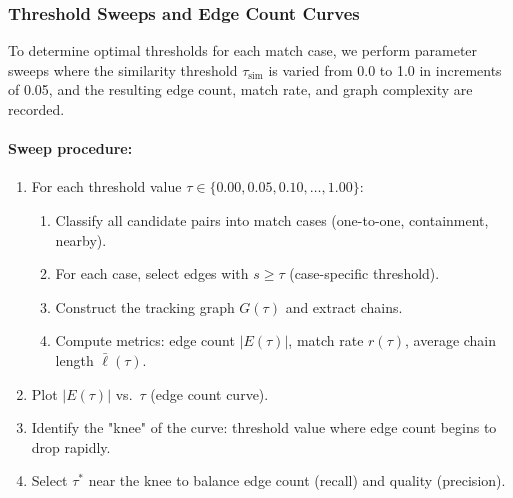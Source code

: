 \subsubsection{Threshold Sweeps and Edge Count Curves}

To determine optimal thresholds for each match case, we perform parameter sweeps where the similarity threshold $\tau_{\text{sim}}$ is varied from 0.0 to 1.0 in increments of 0.05, and the resulting edge count, match rate, and graph complexity are recorded.

\paragraph{Sweep procedure:}
\begin{enumerate}
    \item For each threshold value $\tau \in \{0.00, 0.05, 0.10, \ldots, 1.00\}$:
    \begin{enumerate}
        \item Classify all candidate pairs into match cases (one-to-one, containment, nearby).
        \item For each case, select edges with $s \geq \tau$ (case-specific threshold).
        \item Construct the tracking graph $G(\tau)$ and extract chains.
        \item Compute metrics: edge count $|E(\tau)|$, match rate $r(\tau)$, average chain length $\bar{\ell}(\tau)$.
    \end{enumerate}
    \item Plot $|E(\tau)|$ vs.\ $\tau$ (edge count curve).
    \item Identify the "knee" of the curve: threshold value where edge count begins to drop rapidly.
    \item Select $\tau^*$ near the knee to balance edge count (recall) and quality (precision).
\end{enumerate}

